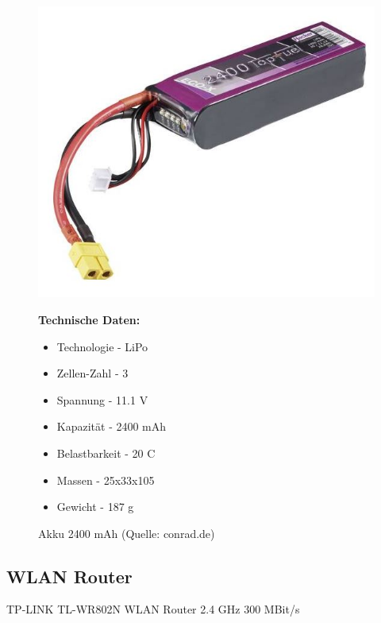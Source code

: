 \begin{figure}[htb]
	\centering
	\begin{minipage}{0.49\linewidth}
		\centering
		\includegraphics[scale=0.5]{images/akku.jpg}
		\caption{Akku 2400 mAh \newline (Quelle: conrad.de)}
	\end{minipage}
	\begin{minipage}{0.45\linewidth}
		\textbf{Technische Daten:} 
		\begin{itemize} 
			\item Technologie - LiPo 
		    \item Zellen-Zahl - 3
			\item Spannung - 11.1 V
			\item Kapazität - 2400 mAh
			\item Belastbarkeit - 20 C
			\item Massen - 25x33x105
			\item Gewicht - 187 g
		\end{itemize}
	\end{minipage}
\end{figure}

\subsection{WLAN Router}

TP-LINK TL-WR802N WLAN Router 2.4 GHz 300 MBit/s

